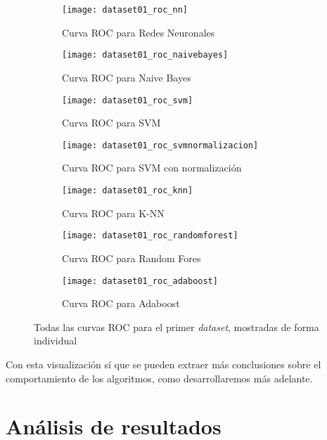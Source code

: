 \documentclass[11pt]{article}
\begin{document}
\begin{figure}[H]
    \centering

    \begin{subfigure}[b]{0.4 \textwidth}
        \texttt{[image: dataset01\_roc\_nn]}
        \caption{Curva ROC para Redes Neuronales}
    \end{subfigure}
    \begin{subfigure}[b]{0.4 \textwidth}
        \texttt{[image: dataset01\_roc\_naivebayes]}
        \caption{Curva ROC para Naive Bayes}
    \end{subfigure}

    \begin{subfigure}[b]{0.4 \textwidth}
        \texttt{[image: dataset01\_roc\_svm]}
        \caption{Curva ROC para SVM}
    \end{subfigure}
    \begin{subfigure}[b]{0.4 \textwidth}
        \texttt{[image: dataset01\_roc\_svmnormalizacion]}
        \caption{Curva ROC para SVM con normalización}
    \end{subfigure}

    \begin{subfigure}[b]{0.4 \textwidth}
        \texttt{[image: dataset01\_roc\_knn]}
        \caption{Curva ROC para K-NN}
    \end{subfigure}
    \begin{subfigure}[b]{0.4 \textwidth}
        \texttt{[image: dataset01\_roc\_randomforest]}
        \caption{Curva ROC para Random Fores}
    \end{subfigure}

    \begin{subfigure}[b]{0.4 \textwidth}
        \texttt{[image: dataset01\_roc\_adaboost]}
        \caption{Curva ROC para Adaboost}
    \end{subfigure}

    \caption{Todas las curvas ROC para el primer \emph{dataset}, mostradas de forma individual}
\end{figure}

Con esta visualización sí que se pueden extraer más conclusiones sobre el comportamiento de los algoritmos, como desarrollaremos más adelante.

\pagebreak

\section{Análisis de resultados}
\end{document}
